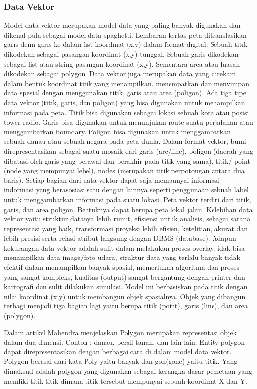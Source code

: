 \subsubsection{Data Vektor}
Model data vektor merupakan model data yang paling banyak digunakan dan dikenal pula sebagai model data spaghetti. Lembaran kertas peta ditranslasikan garis demi garis ke dalam list koordinat (x,y) dalam format digital. Sebuah titik dikodekan sebagai pasangan koordinat (x,y) tunggal. Sebuah garis dikodekan sebagai list atau string pasangan koordinat (x,y). Sementara area atau luasan dikodekan sebagai polygon. Data vektor juga merupakan data yang direkam dalam bentuk koordinat titik yang menampilkan, menempatkan dan menyimpan data spesial dengan menggunakan titik, garis atau area (poligon). Ada tiga tipe data vektor (titik, garis, dan poligon) yang bisa digunakan untuk menampilkan informasi pada peta. Titik bisa digunakan sebagai lokasi sebuah kota atau posisi tower radio. Garis bisa digunakan untuk menunjukan route suatu perjalanan atau menggambarkan boundary. Poligon bisa digunakan untuk menggambarkan sebuah danau atau sebuah negara pada peta dunia. Dalam format vektor, bumi direpresentasikan sebagai suatu mosaik dari garis (arc/line), poligon (daerah yang dibatasi oleh garis yang berawal dan berakhir pada titik yang sama), titik/ point (node yang mempunyai lebel), nodes (merupakan titik perpotongan antara dua baris). Setiap bagian dari data vektor dapat saja mempunyai informasi – indormasi yang berasosiasi satu dengan lainnya seperti penggunaan sebuah label untuk menggambarkan informasi pada suatu lokasi. Peta vektor terdiri dari titik, garis, dan area poligon. Bentuknya dapat berupa peta lokal jalan. Kelebihan data vektor yaitu struktur datanya lebih rumit, efisiensi untuk analisis, sebagai sarana representasi yang baik, transformasi proyeksi lebih efisien, ketelitian, akurat dan lebih presisi serta relasi atribut langsung dengan DBMS (database). Adapun kekurangan data vektor adalah sulit dalam melakukan proses overlay, idak bisa menampilkan data image/foto udara, struktur data yang terlalu banyak tidak efektif dalam menampilkan banyak spasial, memerlukan algoritma dan proses yang sangat kompleks, kualitas (output) sangat bergantung dengan printer dan kartografi dan sulit dilakukan simulasi.
Model ini berbasiskan pada titik dengan nilai koordinat (x,y) untuk membangun objek spasialnya. Objek yang dibangun terbagi menjadi tiga bagian lagi yaitu berupa titik (point), garis (line), dan area (polygon).


Dalam artikel Mahendra menjelaskan Polygon merupakan representasi objek dalam dua dimensi. Contoh : danau,
persil tanah, dan lain-lain. Entity polygon dapat direpresentasikan dengan berbagai cara di dalam model data vektor. 
Polygon berasal dari kata Poly yaitu banyak dan gon(gone) yaitu titik. Yang dimaksud adalah polygon yang digunakan sebagai kerangka dasar pemetaan yang memliki titik-titik dimana titik tersebut mempunyai sebuah koordinat X dan Y. 

